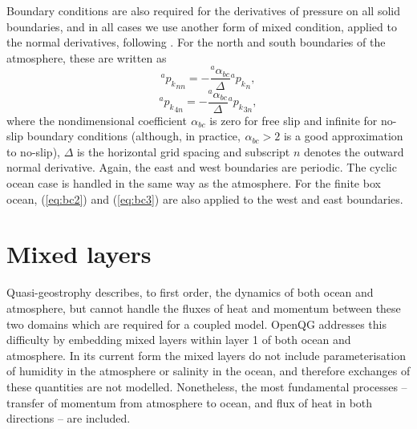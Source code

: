 \documentclass[11pt, a4paper,twoside]{article}
\newcommand{\p}[2]{{{}^{#1}p_{#2}}}
\newcommand{\alphbc}[1]{{}^{#1}\alpha_{bc}}
\numberwithin{equation}{section}
\begin{document}
Boundary conditions are also required for the derivatives of pressure on all solid boundaries, and in all cases we use another form of mixed condition, applied to the normal derivatives, following \citet{haidvogel:92}.
For the north and south boundaries of the atmosphere, these are written as
\begin{equation}\label{eq:bc2}
\p{a}{k}_{nn} = -  \frac{\alphbc{a}}{\Delta} \p{a}{k}_n,
\end{equation}
\begin{equation}\label{eq:bc3}
\p{a}{k}_{4n} = - \frac{\alphbc{a}}{\Delta} \p{a}{k}_{3n},
\end{equation}
where the nondimensional coefficient $\alphbc{}$ is zero for free slip and infinite for no-slip boundary conditions (although, in practice, $\alphbc{}>2$ is a good approximation to no-slip), $\Delta$ is the horizontal grid spacing and subscript $n$ denotes the outward normal derivative.
Again, the east and west boundaries are periodic. 
The cyclic ocean case is handled in the same way as the atmosphere. For the finite box ocean, (\ref{eq:bc2}) and (\ref{eq:bc3}) are also applied to the west and east boundaries.

\section{Mixed layers}\label{sec:mixed}
Quasi-geostrophy describes, to first order, the dynamics of both ocean and atmosphere, but cannot handle the fluxes of heat and momentum between these two domains which are required for a coupled model.
OpenQG addresses this difficulty by embedding mixed layers within layer 1 of both ocean and atmosphere.
In its current form the mixed layers do not include parameterisation of humidity in the atmosphere or salinity in the ocean, and therefore exchanges of these quantities are not modelled.
Nonetheless, the most fundamental processes -- transfer of momentum from atmosphere to ocean, and flux of heat in both directions -- are included.
\end{document}
